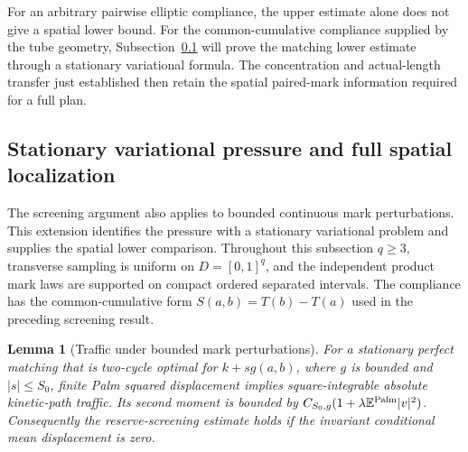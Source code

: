 \documentclass[11pt,reqno]{amsart}
\newtheorem{lemma}[theorem]{Lemma}
\theoremstyle{definition}
\theoremstyle{remark}
\numberwithin{equation}{section}
\newcommand{\E}{\mathbb E}
\begin{document}
For an arbitrary pairwise elliptic compliance, the upper estimate
alone does not give a spatial lower bound. For the common-cumulative
compliance supplied by the tube geometry,
Subsection~\ref{subsec:highd-stationary-pressure} will prove the
matching lower estimate through a stationary variational formula.
The concentration and actual-length transfer just established then
retain the spatial paired-mark information required for a full plan.

\subsection{Stationary variational pressure and full spatial localization}
\label{subsec:highd-stationary-pressure}

The screening argument also applies to bounded continuous mark
perturbations. This extension identifies the pressure with a stationary
variational problem and supplies the spatial lower comparison.
Throughout this subsection \(q\ge3\), transverse sampling is uniform
on \(D=[0,1]^q\), and the independent product mark laws are supported
on compact ordered separated intervals. The compliance has the common-cumulative
form \(S(a,b)=T(b)-T(a)\) used in the preceding screening result.

\begin{lemma}[Traffic under bounded mark perturbations]
\label{lem:highd-perturbed-traffic}
For a stationary perfect matching that is two-cycle optimal for
\(k+s g(a,b)\), where \(g\) is bounded and \(|s|\le S_0\),
finite Palm squared displacement implies square-integrable absolute
kinetic-path traffic. Its second moment is bounded by
\(C_{S_0,g}(1+\lambda\E^{\rm Palm}|v|^2)\).
Consequently the reserve-screening estimate holds if the invariant
conditional mean displacement is zero.
\end{lemma}
\end{document}
